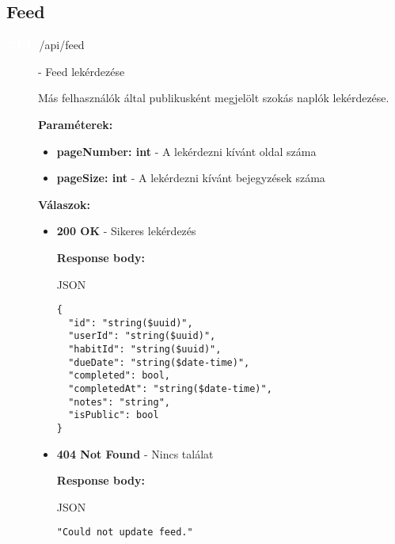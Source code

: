 \documentclass[12pt]{report}
\newcommand{\httpGet}[1]{\colorbox{getColor}{\textbf{\textcolor{white}{GET}}}~#1}
\begin{document}
\subsection{Feed}
\begin{description}
  \item[\httpGet{/api/feed}] - Feed lekérdezése
  
    \vspace{0.5cm}
    Más felhasználók által publikusként megjelölt szokás naplók lekérdezése.

    \vspace{0.5cm}
    \textbf{Paraméterek:}
    \begin{itemize}
      \item \textbf{pageNumber: int} - A lekérdezni kívánt oldal száma
      \item \textbf{pageSize: int} - A lekérdezni kívánt bejegyzések száma
    \end{itemize}

    \vspace{0.5cm}
    \textbf{Válaszok:}
    \begin{itemize}
      \item \textbf{200 OK} - Sikeres lekérdezés

        \textbf{Response body:}
        \begin{codeblock}{JSON}
          \begin{verbatim}
{
  "id": "string($uuid)",
  "userId": "string($uuid)",
  "habitId": "string($uuid)",
  "dueDate": "string($date-time)",
  "completed": bool,
  "completedAt": "string($date-time)",
  "notes": "string",
  "isPublic": bool
}
          \end{verbatim}
        \end{codeblock}

      \item \textbf{404 Not Found} - Nincs találat
      
        \textbf{Response body:}
        \begin{codeblock}{JSON}
          \begin{verbatim}
"Could not update feed."
          \end{verbatim}
        \end{codeblock}
    \end{itemize}
\end{description}
\end{document}
